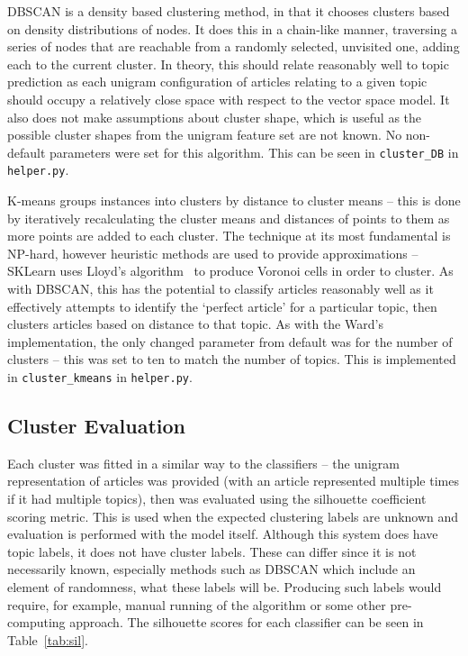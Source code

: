 \documentclass[11pt]{article}
\begin{document}
DBSCAN is a density based clustering method, in that it chooses clusters based on density distributions of nodes. It does this in a chain-like manner, traversing a series of nodes that are reachable from a randomly selected, unvisited one, adding each to the current cluster. In theory, this should relate reasonably well to topic prediction as each unigram configuration of articles relating to a given topic should occupy a relatively close space with respect to the vector space model. It also does not make assumptions about cluster shape, which is useful as the possible cluster shapes from the unigram feature set are not known. No non-default parameters were set for this algorithm. This can be seen in \texttt{cluster\_DB} in \texttt{helper.py}.


K-means groups instances into clusters by distance to cluster means – this is done by iteratively recalculating the cluster means and distances of points to them as more points are added to each cluster. The technique at its most fundamental is NP-hard, however heuristic methods are used to provide approximations – SKLearn uses Lloyd's algorithm~\cite{lloyd} to produce Voronoi cells in order to cluster. As with DBSCAN, this has the potential to classify articles reasonably well as it effectively attempts to identify the `perfect article' for a particular topic, then clusters articles based on distance to that topic. As with the Ward’s implementation, the only changed parameter from default was for the number of clusters – this was set to ten to match the number of topics. This is implemented in \texttt{cluster\_kmeans} in \texttt{helper.py}.

\subsection{Cluster Evaluation}
Each cluster was fitted in a similar way to the classifiers – the unigram representation of articles was provided (with an article represented multiple times if it had multiple topics), then was evaluated using the silhouette coefficient scoring metric. This is used when the expected clustering labels are unknown and evaluation is performed with the model itself. Although this system does have topic labels, it does not have cluster labels. These can differ since it is not necessarily known, especially methods such as DBSCAN which include an element of randomness, what these labels will be. Producing such labels would require, for example, manual running of the algorithm or some other pre-computing approach. The silhouette scores for each classifier can be seen in Table~\ref{tab:sil}.
\end{document}
